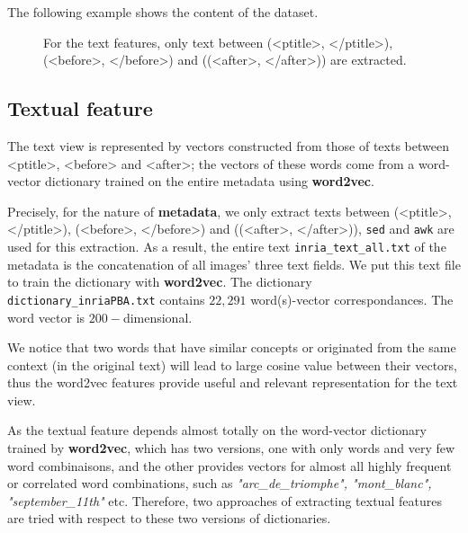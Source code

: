 \documentclass[12pt]{report}	%
\begin{document}
The following example shows the content of the dataset.
\begin{figure}[H]
\centering
{}
 \caption{For the text features, only text between (<ptitle>, </ptitle>), (<before>, </before>) and ((<after>, </after>)) are extracted.}
\label{fig:inria-dataset}
\end{figure} 


\subsection{Textual feature}
The text view is represented by vectors constructed from those of texts between <ptitle>, <before> and <after>; the vectors of these words come from a word-vector dictionary trained on the entire metadata using \textbf{word2vec}.

Precisely, for the nature of \textbf{metadata}, we only extract texts between (<ptitle>, </ptitle>), (<before>, </before>) and ((<after>, </after>)), \texttt{sed} and \texttt{awk} are used for this extraction. As a result, the entire text \texttt{inria\_text\_all.txt} of the metadata is the concatenation of all images' three text fields. We put this text file to train the dictionary with \textbf{word2vec}. The dictionary \texttt{dictionary\_inriaPBA.txt} contains $22,291$ word(s)-vector correspondances. The word vector is $200-$dimensional.

We notice that two words that have similar concepts or originated from the same context (in the original text) will lead to large cosine value between their vectors, thus the word2vec features provide useful and relevant representation for the text view.

As the textual feature depends almost totally on the word-vector dictionary trained by \textbf{word2vec}, which has two versions, one with only words and very few word combinaisons, and the other provides vectors for almost all highly frequent or correlated word combinations, such as \textit{"arc\_de\_triomphe", "mont\_blanc", "september\_11th"} etc. Therefore, two approaches of extracting textual features are tried with respect to these two versions of dictionaries.
\end{document}
